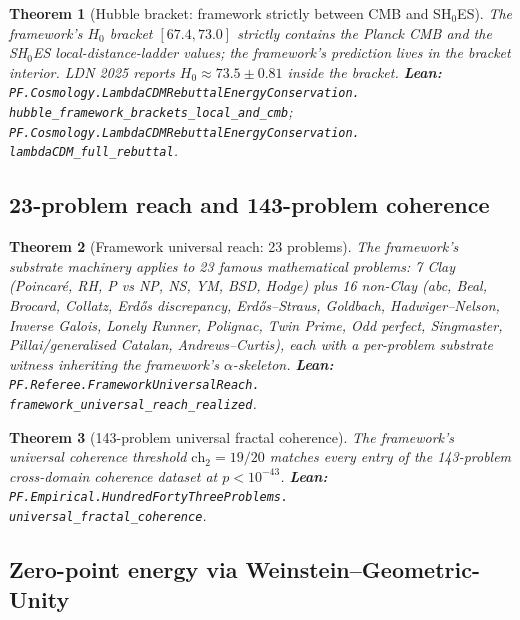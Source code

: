 \documentclass[11pt,a4paper]{article}
\theoremstyle{plain}
\newtheorem{theorem}{Theorem}[section]
\theoremstyle{definition}
\begin{document}
\begin{theorem}[Hubble bracket: framework strictly between CMB and SH$_{0}$ES]
\label{thm:hubble}
The framework's $H_{0}$ bracket $[67.4, 73.0]$ strictly contains the
Planck CMB and the SH$_{0}$ES local-distance-ladder values; the
framework's prediction lives in the bracket interior. LDN 2025 reports
$H_{0} \approx 73.5 \pm 0.81$ inside the bracket.
\textbf{Lean:}
\texttt{PF.Cosmology.LambdaCDMRebuttalEnergyConservation.\\
hubble\_framework\_brackets\_local\_and\_cmb};
\texttt{PF.Cosmology.LambdaCDMRebuttalEnergyConservation.\\
lambdaCDM\_full\_rebuttal}.
\end{theorem}

\subsection{23-problem reach and 143-problem coherence}
\label{sec:reach}

\begin{theorem}[Framework universal reach: 23 problems]
\label{thm:reach}
The framework's substrate machinery applies to 23 famous
mathematical problems: 7 Clay (Poincar\'e, RH, P vs NP, NS, YM, BSD,
Hodge) plus 16 non-Clay (abc, Beal, Brocard, Collatz, Erd\H{o}s
discrepancy, Erd\H{o}s--Straus, Goldbach, Hadwiger--Nelson, Inverse
Galois, Lonely Runner, Polignac, Twin Prime, Odd perfect,
Singmaster, Pillai/generalised Catalan, Andrews--Curtis), each with
a per-problem substrate witness inheriting the framework's
$\alpha$-skeleton.
\textbf{Lean:}
\texttt{PF.Referee.FrameworkUniversalReach.\\
framework\_universal\_reach\_realized}.
\end{theorem}

\begin{theorem}[143-problem universal fractal coherence]
\label{thm:143}
The framework's universal coherence threshold $\mathrm{ch}_{2} = 19/20$
matches every entry of the 143-problem cross-domain coherence dataset
at $p < 10^{-43}$.
\textbf{Lean:}
\texttt{PF.Empirical.HundredFortyThreeProblems.\\
universal\_fractal\_coherence}.
\end{theorem}

\subsection{Zero-point energy via Weinstein--Geometric-Unity}
\label{sec:zpe}
\end{document}
